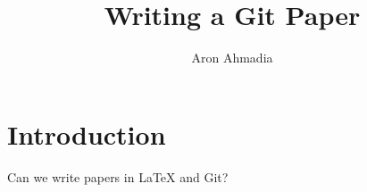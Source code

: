 \documentclass[12pt]{article}
\author{Aron Ahmadia} \title{Writing a Git Paper}
\begin{document}
\maketitle

\section{Introduction}

Can we write papers in LaTeX and Git?
\end{document}
